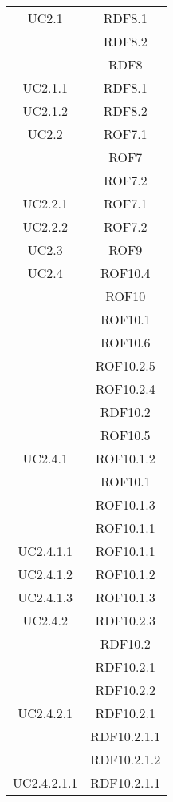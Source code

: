 \begin{longtable}{|c|c|}
\midrule
UC2.1
& RDF8.1\\
& RDF8.2\\
& RDF8\\

\midrule
UC2.1.1
& RDF8.1\\

\midrule
UC2.1.2
& RDF8.2\\

\midrule
UC2.2
& ROF7.1\\
& ROF7\\
& ROF7.2\\

\midrule
UC2.2.1
& ROF7.1\\

\midrule
UC2.2.2
& ROF7.2\\

\midrule
UC2.3
& ROF9\\

\midrule
UC2.4
& ROF10.4\\
& ROF10\\
& ROF10.1\\
& ROF10.6\\
& ROF10.2.5\\
& ROF10.2.4\\
& RDF10.2\\
& ROF10.5\\

\midrule
UC2.4.1
& ROF10.1.2\\
& ROF10.1\\
& ROF10.1.3\\
& ROF10.1.1\\

\midrule
UC2.4.1.1
& ROF10.1.1\\

\midrule
UC2.4.1.2
& ROF10.1.2\\

\midrule
UC2.4.1.3
& ROF10.1.3\\

\midrule
UC2.4.2
& RDF10.2.3\\
& RDF10.2\\
& RDF10.2.1\\
& RDF10.2.2\\

\midrule
UC2.4.2.1
& RDF10.2.1\\
& RDF10.2.1.1\\
& RDF10.2.1.2\\

\midrule
UC2.4.2.1.1
& RDF10.2.1.1\\


\end{longtable}
